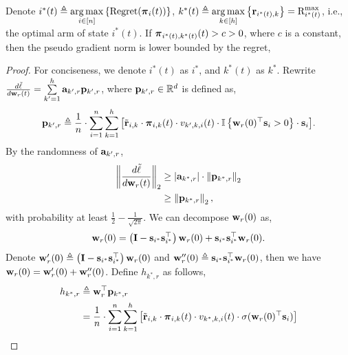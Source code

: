 \documentclass[10pt]{article}
\DeclareMathOperator*{\argmax}{arg\,max}
\begin{document}
\begin{lem}
	Denote $i^*(t) \triangleq \argmax\limits_{i \in [n]}\left\{\regret(\rvpi_i(t))\right\}$, $k^*(t) \triangleq \argmax\limits_{k \in [h]}\left\{ \rvr_{i^*(t),k} \right\} = \r_{i^*(t)}^{\max}$, i.e., the optimal arm of state $i^*(t)$. If ${\boldsymbol{\pi}}_{i^*(t), k^*(t)}(t) > c > 0$, where $c$ is a constant, then the pseudo gradient norm is lower bounded by the regret,
\end{lem}
\begin{proof}
	 For conciseness, we denote $i^*(t)$ as $i^*$, and $k^*(t)$ as $k^*$. Rewrite $\frac{d\tilde{\ell}}{d {\mathbf{w}}_r(t)} = \sum\limits_{k^
	\prime=1}^{h}{ {\mathbf{a}}_{k^\prime,r} {\mathbf{p}}_{k^\prime, r} }$, where ${\mathbf{p}}_{k^\prime, r} \in {\mathbb{R}}^d$ is defined as, 
\begin{equation*}
	{\mathbf{p}}_{k^\prime, r} \triangleq \frac{1}{n} \cdot \sum\limits_{i=1}^{n}{ \sum\limits_{k=1}^{h}{ \left[ {\tilde{\mathbf{r}}}_{i,k} \cdot {\boldsymbol{\pi}}_{i,k}(t) \cdot v_{k^\prime,k,i}(t) \cdot {\mathbb{I}}\left\{ {\mathbf{w}}_r(0)^\top {\mathbf{s}}_i > 0 \right\} \cdot {\mathbf{s}}_i \right] } }.
\end{equation*}
By the randomness of ${\mathbf{a}}_{k^\prime,r}$,
\begin{equation*}
\begin{split}
	\left\| \frac{d\tilde{\ell}}{d {\mathbf{w}}_r(t)} \right\|_2 &\ge \left| {\mathbf{a}}_{k^*,r} \right| \cdot \left\| {\mathbf{p}}_{k^*, r}\right\|_2 \\
	&\ge \left\| {\mathbf{p}}_{k^*, r}\right\|_2,
\end{split}
\end{equation*}
with probability at least $\frac{1}{2} - \frac{1}{\sqrt{2\pi}}$. We can decompose ${\mathbf{w}}_r(0)$ as,
\begin{equation}
\label{eq:decompose_w}
	{\mathbf{w}}_r(0) =  \left( {\mathbf{I}} - {\mathbf{s}}_{i^*}{\mathbf{s}}_{i^*}^\top \right) {\mathbf{w}}_r(0) +  {\mathbf{s}}_{i^*}{\mathbf{s}}_{i^*}^\top {\mathbf{w}}_r(0).
\end{equation}
Denote ${\mathbf{w}}_r^\prime(0) \triangleq \left( {\mathbf{I}} - {\mathbf{s}}_{i^*}{\mathbf{s}}_{i^*}^\top \right) {\mathbf{w}}_r(0)$ and ${\mathbf{w}}_r^{\prime\prime}(0) \triangleq {\mathbf{s}}_{i^*}{\mathbf{s}}_{i^*}^\top {\mathbf{w}}_r(0)$, then we have ${\mathbf{w}}_r(0) = {\mathbf{w}}_r^\prime(0) + {\mathbf{w}}_r^{\prime\prime}(0)$. Define $h_{k^*,r}$ as follows,
\begin{equation*}
\begin{split}
	h_{k^*,r} &\triangleq \rvw_r^\top \rvp_{k^*, r} \\
	&= \frac{1}{n} \cdot \sum\limits_{i=1}^{n}{ \sum\limits_{k=1}^{h}{ \left[ \rvtilder_{i,k} \cdot \rvpi_{i,k}(t) \cdot v_{k^*,k,i}(t) \cdot \sigma( \rvw_r(0)^\top \rvs_i ) \right] } }
\end{split}

\end{equation*}
\end{proof}
\end{document}
